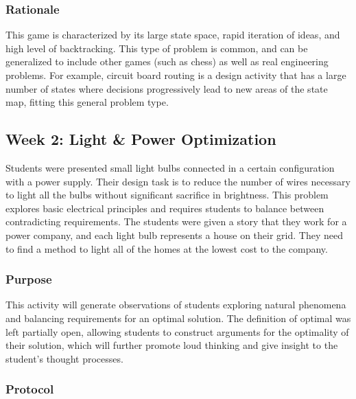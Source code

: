 	\subsubsection{Rationale}
	
	This game is characterized by its large state space, rapid iteration of ideas, and high level of backtracking. This type of problem is common, and can be generalized to include other games (such as chess) as well as real engineering problems. For example, circuit board routing is a design activity that has a large number of states where decisions progressively lead to new areas of the state map, fitting this general problem type.

\subsection{Week 2: Light \& Power Optimization}

	Students were presented small light bulbs connected in a certain
	configuration with a power supply. Their design task is to reduce
	the number of wires necessary to light all the bulbs without significant
	sacrifice in brightness. This problem explores basic electrical principles
	and requires students to balance between contradicting requirements.
	The students were given a story that they work for a power company,
	and each light bulb represents a house on their grid. They need to
	find a method to light all of the homes at the lowest cost to the
	company.
	
	
	\subsubsection{Purpose}
	
	This activity will generate observations of students exploring natural
	phenomena and balancing requirements for an optimal solution. The
	definition of optimal was left partially open, allowing students
	to construct arguments for the optimality of their solution, which
	will further promote loud thinking and give insight to the student's
	thought processes.
	
	
	\subsubsection{Protocol}
	
